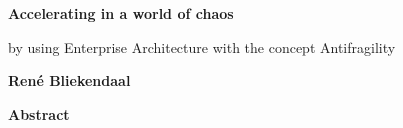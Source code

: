 \thispagestyle{plain}
{}
\begin{center}
	\Large
	\textbf{Accelerating in a world of chaos}
	
	\vspace{0.4cm}
	\large
	by using Enterprise Architecture with the concept Antifragility
	
	\vspace{0.4cm}
	\textbf{René Bliekendaal}
	
	\vspace{0.9cm}
	\textbf{Abstract}
\end{center}

\lipsum[1]
